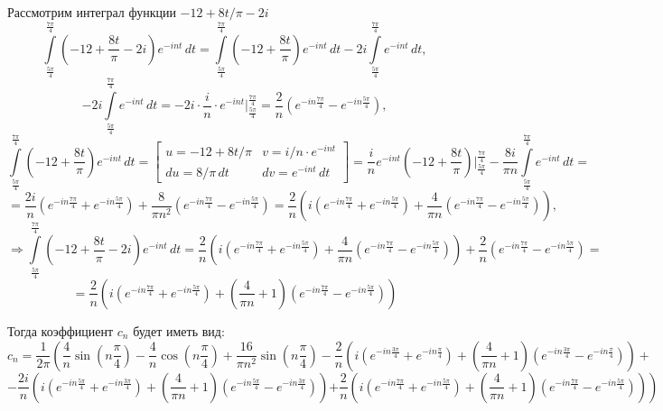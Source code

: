 \documentclass[a4paper, 16pt]{article}
\begin{document}
\noindent Рассмотрим интеграл функции $-12+8t/\pi-2i$
$$
\int\limits_{\frac{5\pi}{4}}^{\frac{7\pi}{4}}\left(-12+\dfrac{8t}{\pi}-2i\right)e^{-int}\,dt=
\int\limits_{\frac{5\pi}{4}}^{\frac{7\pi}{4}}\left(-12+\dfrac{8t}{\pi}\right)e^{-int}\,dt-2i\int\limits_{\frac{5\pi}{4}}^{\frac{7\pi}{4}}e^{-int}\,dt,
$$
$$
-2i\int\limits_{\frac{5\pi}{4}}^{\frac{7\pi}{4}}e^{-int}\,dt=-2i\cdot\dfrac{i}{n}\cdot e^{-int}\bigg|_{\frac{5\pi}{4}}^{\frac{7\pi}{4}}=
\dfrac{2}{n}\left(e^{-in\frac{7\pi}{4}}-e^{-in\frac{5\pi}{4}}\right),
$$
$$
\int\limits_{\frac{5\pi}{4}}^{\frac{7\pi}{4}}\left(-12+\dfrac{8t}{\pi}\right)e^{-int}\,dt=
\begin{bmatrix}
    u=-12+8t/\pi & v=i/n\cdot e^{-int} \\
    du=8/\pi\,dt & dv=e^{-int}\,dt
\end{bmatrix}=
\dfrac{i}{n}e^{-int}\left(-12+\dfrac{8t}{\pi}\right)\bigg|_{\frac{5\pi}{4}}^{\frac{7\pi}{4}}-\dfrac{8i}{\pi n}\int\limits_{\frac{5\pi}{4}}^{\frac{7\pi}{4}}e^{-int}\,dt=
$$
$$
=\dfrac{2i}{n}\left(e^{-in\frac{7\pi}{4}}+e^{-in\frac{5\pi}{4}}\right)+\dfrac{8}{\pi n^2}\left(e^{-in\frac{7\pi}{4}}-e^{-in\frac{5\pi}{4}}\right)=
\dfrac{2}{n}\left(i\left(e^{-in\frac{7\pi}{4}}+e^{-in\frac{5\pi}{4}}\right)+\dfrac{4}{\pi n}\left(e^{-in\frac{7\pi}{4}}-e^{-in\frac{5\pi}{4}}\right)\right),
$$
$$
\Rightarrow\int\limits_{\frac{5\pi}{4}}^{\frac{7\pi}{4}}\left(-12+\dfrac{8t}{\pi}-2i\right)e^{-int}\,dt=
\dfrac{2}{n}\left(i\left(e^{-in\frac{7\pi}{4}}+e^{-in\frac{5\pi}{4}}\right)+\dfrac{4}{\pi n}\left(e^{-in\frac{7\pi}{4}}-e^{-in\frac{5\pi}{4}}\right)\right)+\dfrac{2}{n}\left(e^{-in\frac{7\pi}{4}}-e^{-in\frac{5\pi}{4}}\right)=
$$
$$
=\dfrac{2}{n}\left(i\left(e^{-in\frac{7\pi}{4}}+e^{-in\frac{5\pi}{4}}\right)+\left(\dfrac{4}{\pi n}+1\right)\left(e^{-in\frac{7\pi}{4}}-e^{-in\frac{5\pi}{4}}\right)\right)
$$


\noindent Тогда коэффициент $c_n$ будет иметь вид:
$$
c_n=\dfrac{1}{2\pi}\left(\dfrac{4}{n}\sin{\left(n\dfrac{\pi}{4}\right)}-\dfrac{4}{n}\cos{\left(n\dfrac{\pi}{4}\right)}+\dfrac{16}{\pi n^2}\sin{\left(n\dfrac{\pi}{4}\right)}\right.
-\dfrac{2}{n}\left(i\left(e^{-in\frac{3\pi}{4}}+e^{-in\frac{\pi}{4}}\right)+\left(\dfrac{4}{\pi n}+1\right)\left(e^{-in\frac{3\pi}{4}}-e^{-in\frac{\pi}{4}}\right)\right)+
$$
$$
-\dfrac{2i}{n}\left(i\left(e^{-in\frac{5\pi}{4}}+e^{-in\frac{3\pi}{4}}\right)+\left(\dfrac{4}{\pi n}+1\right)\left(e^{-in\frac{5\pi}{4}}-e^{-in\frac{3\pi}{4}}\right)\right)
\left.+\dfrac{2}{n}\left(i\left(e^{-in\frac{7\pi}{4}}+e^{-in\frac{5\pi}{4}}\right)+\left(\dfrac{4}{\pi n}+1\right)\left(e^{-in\frac{7\pi}{4}}-e^{-in\frac{5\pi}{4}}\right)\right)\right)
$$
\end{document}
